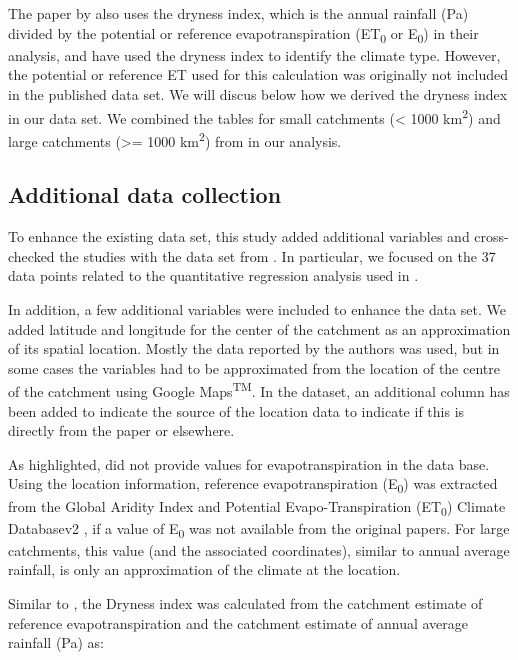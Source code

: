 \documentclass[]{elsarticle} %
\begin{document}
The paper by \citet{zhang2017} also uses the dryness index, which is the annual rainfall (Pa) divided by the potential or reference evapotranspiration (ET\textsubscript{0} or E\textsubscript{0}) in their analysis, and have used the dryness index to identify the climate type. However, the potential or reference ET used for this calculation was originally not included in the published data set. We will discus below how we derived the dryness index in our data set. We combined the tables for small catchments (\textless{} 1000 km\textsuperscript{2}) and large catchments (\textgreater= 1000 km\textsuperscript{2}) from \citet{zhang2017} in our analysis.

\hypertarget{additional-data-collection}{%
\subsection{Additional data collection}\label{additional-data-collection}}

To enhance the existing data set, this study added additional variables and cross-checked the studies with the data set from \citet{filoso2017}. In particular, we focused on the 37 data points related to the quantitative regression analysis used in \citet{filoso2017}.

In addition, a few additional variables were included to enhance the data set. We added latitude and longitude for the center of the catchment as an approximation of its spatial location. Mostly the data reported by the authors was used, but in some cases the variables had to be approximated from the location of the centre of the catchment using Google Maps\textsuperscript{TM}. In the dataset, an additional column has been added to indicate the source of the location data to indicate if this is directly from the paper or elsewhere.

As highlighted, \citet{zhang2017} did not provide values for evapotranspiration in the data base. Using the location information, reference evapotranspiration (E\textsubscript{0}) was extracted from the Global Aridity Index and Potential Evapo-Transpiration (ET\textsubscript{0}) Climate Databasev2 \citep{trabucco2018}, if a value of E\textsubscript{0} was not available from the original papers. For large catchments, this value (and the associated coordinates), similar to annual average rainfall, is only an approximation of the climate at the location.

Similar to \citet{zhang2017}, the Dryness index was calculated from the catchment estimate of reference evapotranspiration and the catchment estimate of annual average rainfall (Pa) as:
\end{document}
